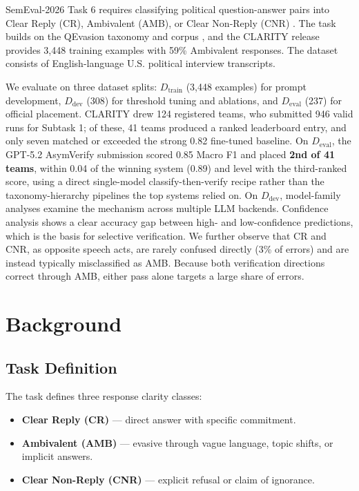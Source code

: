 \documentclass[11pt]{article}
\newcommand{\rev}[1]{#1}
\begin{document}
SemEval-2026 Task 6 requires classifying political question-answer pairs into Clear Reply (CR), Ambivalent (AMB), or Clear Non-Reply (CNR) \citep{thomas2026semeval2026task6clarity}. The task builds on the QEvasion taxonomy and corpus \citep{thomas-etal-2024-never}, and the CLARITY release provides 3,448 training examples with 59\% Ambivalent responses. The dataset consists of English-language U.S. political interview transcripts.

We evaluate on three dataset splits: $D_{\text{train}}$ (3,448 examples) for prompt development, $D_{\text{dev}}$ (308) for threshold tuning and ablations, and $D_{\text{eval}}$ (237) for official placement. CLARITY drew 124 registered teams, who submitted 946 valid runs for Subtask 1; of these, 41 teams produced a ranked leaderboard entry, and only seven matched or exceeded the strong 0.82 fine-tuned baseline. On $D_{\text{eval}}$, the GPT-5.2 AsymVerify submission scored 0.85 Macro F1 and placed \textbf{2nd of 41 teams}, within 0.04 of the winning system (0.89) and level with the third-ranked score, using a direct single-model classify-then-verify recipe rather than the taxonomy-hierarchy pipelines the top systems relied on. On $D_{\text{dev}}$, model-family analyses examine the mechanism across multiple LLM backends. Confidence analysis shows a clear accuracy gap between high- and low-confidence predictions, which is the basis for selective verification. We further observe that CR and CNR, as opposite speech acts, are rarely confused directly (3\% of errors) and are instead typically misclassified as AMB. Because both verification directions correct through AMB, either pass alone \rev{targets} a large share of errors.

\section{Background}

\subsection{Task Definition}

The task defines three response clarity classes:

\begin{itemize}[nosep,leftmargin=*]
\item \textbf{Clear Reply (CR)} --- direct answer with specific commitment.

\item \textbf{Ambivalent (AMB)} --- evasive through vague language, topic shifts, or implicit answers.

\item \textbf{Clear Non-Reply (CNR)} --- explicit refusal or claim of ignorance.
\end{itemize}
\end{document}
